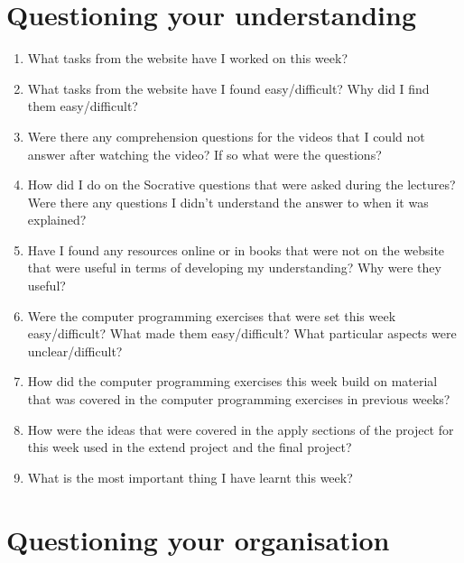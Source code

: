 \documentclass[a4paper]{article}
\begin{document}
\section*{Questioning your understanding}

\begin{enumerate}
\item What tasks from the website have I worked on this week?

\item What tasks from the website have I found easy/difficult?  Why did I find them easy/difficult?

\item Were there any comprehension questions for the videos that I could not answer after watching the video?  If so what were the questions?

\item How did I do on the Socrative questions that were asked during the lectures?  Were there any questions I didn't understand the answer to when it was explained?

\item Have I found any resources online or in books that were not on the website that were useful in terms of developing my understanding?  Why were they useful?

\item Were the computer programming exercises that were set this week easy/difficult?  What made them easy/difficult?  What particular aspects were unclear/difficult?

\item How did the computer programming exercises this week build on material that was covered in the computer programming exercises in previous weeks?   

\item How were the ideas that were covered in the apply sections of the project for this week used in the extend project and the final project? 

\item What is the most important thing I have learnt this week?
\end{enumerate}

\section*{Questioning your organisation}
\end{document}
